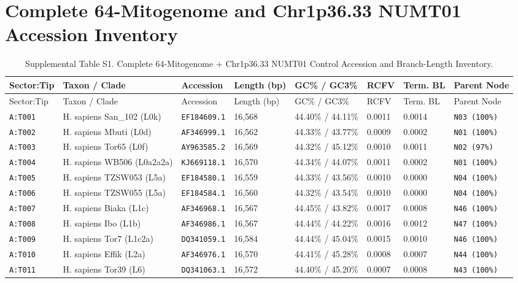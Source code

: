 \documentclass[10pt,letterpaper]{article}
\begin{document}
\section{Complete 64-Mitogenome and Chr1p36.33 NUMT01 Accession Inventory}
\footnotesize
\begin{longtable}{llllllll}
\caption{Supplemental Table S1. Complete 64-Mitogenome + Chr1p36.33 NUMT01 Control Accession and Branch-Length Inventory.} \\
\toprule
Sector:Tip & Taxon / Clade & Accession & Length (bp) & GC\% / GC3\% & RCFV & Term. BL & Parent Node \\
\midrule
\endfirsthead
\toprule
Sector:Tip & Taxon / Clade & Accession & Length (bp) & GC\% / GC3\% & RCFV & Term. BL & Parent Node \\
\midrule
\endhead
\texttt{A:T001} & H. sapiens San\_102 (L0k) & \texttt{EF184609.1} & 16,568 & 44.40\% / 44.11\% & 0.0011 & 0.0014 & \texttt{N03 (100\%)} \\
\texttt{A:T002} & H. sapiens Mbuti (L0d) & \texttt{AF346999.1} & 16,562 & 44.33\% / 43.77\% & 0.0009 & 0.0002 & \texttt{N01 (100\%)} \\
\texttt{A:T003} & H. sapiens Tor65 (L0f) & \texttt{AY963585.2} & 16,569 & 44.32\% / 45.12\% & 0.0010 & 0.0011 & \texttt{N02 (97\%)} \\
\texttt{A:T004} & H. sapiens WB506 (L0a2a2a) & \texttt{KJ669118.1} & 16,570 & 44.34\% / 44.07\% & 0.0011 & 0.0002 & \texttt{N01 (100\%)} \\
\texttt{A:T005} & H. sapiens TZSW053 (L5a) & \texttt{EF184580.1} & 16,559 & 44.33\% / 43.56\% & 0.0010 & 0.0000 & \texttt{N04 (100\%)} \\
\texttt{A:T006} & H. sapiens TZSW055 (L5a) & \texttt{EF184584.1} & 16,560 & 44.32\% / 43.54\% & 0.0010 & 0.0000 & \texttt{N04 (100\%)} \\
\texttt{A:T007} & H. sapiens Biaka (L1c) & \texttt{AF346968.1} & 16,567 & 44.45\% / 43.82\% & 0.0017 & 0.0008 & \texttt{N46 (100\%)} \\
\texttt{A:T008} & H. sapiens Ibo (L1b) & \texttt{AF346986.1} & 16,567 & 44.44\% / 44.22\% & 0.0016 & 0.0012 & \texttt{N47 (100\%)} \\
\texttt{A:T009} & H. sapiens Tor7 (L1c2a) & \texttt{DQ341059.1} & 16,584 & 44.44\% / 45.04\% & 0.0015 & 0.0010 & \texttt{N46 (100\%)} \\
\texttt{A:T010} & H. sapiens Effik (L2a) & \texttt{AF346976.1} & 16,570 & 44.41\% / 45.28\% & 0.0008 & 0.0007 & \texttt{N44 (100\%)} \\
\texttt{A:T011} & H. sapiens Tor39 (L6) & \texttt{DQ341063.1} & 16,572 & 44.40\% / 45.20\% & 0.0007 & 0.0008 & \texttt{N43 (100\%)} \\

\end{longtable}
\end{document}
